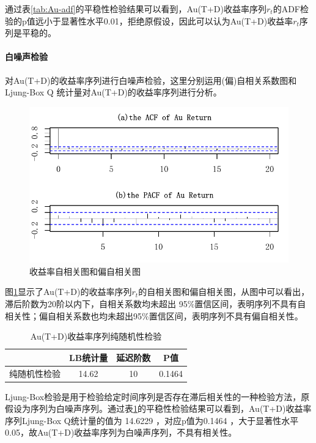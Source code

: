 \documentclass[UTF8,a4paper,12pt]{ctexart}  %
\begin{document}
通过表\ref{tab:Au-adf}的平稳性检验结果可以看到，Au(T+D)收益率序列\(r_t\)的ADF检验的p值远小于显著性水平0.01，拒绝原假设，因此可以认为Au(T+D)收益率\(r_t\)序列是平稳的。

\hypertarget{section-15}{%
\paragraph{白噪声检验}\label{section-15}}

对Au(T+D)的收益率序列进行白噪声检验，这里分别运用(偏)自相关系数图和
Ljung-Box Q 统计量对Au(T+D)的收益率序列进行分析。

\begin{figure}[H]

{\centering \includegraphics[width=0.95\linewidth]{03-estimation-lytfinal_files/figure-latex/acf-pacf-1} 

}

\caption{收益率自相关图和偏自相关图}\label{fig:acf-pacf}
\end{figure}

图\ref{fig:acf-pacf}显示了Au(T+D)的收益率序列\(r_t\)的自相关图和偏自相关图，从图中可以看出，滞后阶数为20阶以内下，自相关系数均未超出 95\%置信区间，表明序列不具有自相关性；偏自相关系数也均未超出95\%置信区间，表明序列不具有偏自相关性。

\begin{longtable}[t]{lccc}
\caption{\label{tab:Au-LB}Au(T+D)收益率序列纯随机性检验}\\
\toprule
  & LB统计量 & 延迟阶数 & P值\\
\midrule
纯随机性检验 & 14.62 & 10 & 0.1464\\
\bottomrule
\end{longtable}

Ljung-Box检验是用于检验给定时间序列是否存在滞后相关性的一种检验方法，原假设为序列为白噪声序列。通过表\ref{tab:Au-LB}的平稳性检验结果可以看到，Au(T+D)收益率序列Ljung-Box Q统计量的值为 14.6229 ，对应p值为0.1464 ，大于显著性水平0.05，故Au(T+D)收益率序列为白噪声序列，不具有相关性。
\end{document}

